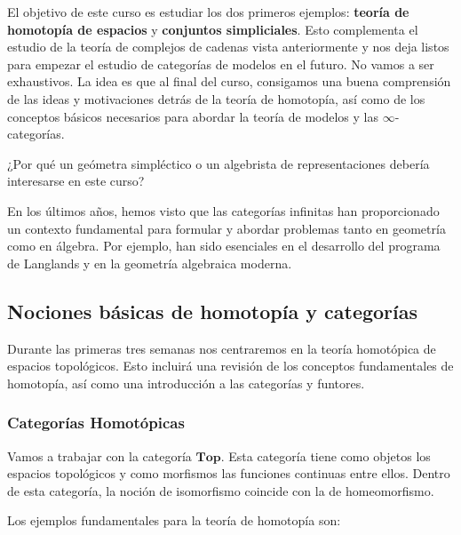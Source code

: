 El objetivo de este curso es estudiar los dos primeros ejemplos: \textbf{teoría de homotopía de espacios} y \textbf{conjuntos simpliciales}. Esto complementa el estudio de la teoría de complejos de cadenas vista anteriormente y nos deja listos para empezar el estudio de categorías de modelos en el futuro. No vamos a ser exhaustivos. La idea es que al final del curso, consigamos una buena comprensión de las ideas y motivaciones detrás de la teoría de homotopía, así como de los conceptos básicos necesarios para abordar la teoría de modelos y las $\infty$-categorías.

\begin{pregunta}
    ¿Por qué un geómetra simpléctico o un algebrista de representaciones debería interesarse en este curso?
\end{pregunta}

En los últimos años, hemos visto que las categorías infinitas han proporcionado un contexto fundamental para formular y abordar problemas tanto en geometría como en álgebra. Por ejemplo, han sido esenciales en el desarrollo del programa de Langlands y en la geometría algebraica moderna.

\subsection{Nociones básicas de homotopía y categorías}

Durante las primeras tres semanas nos centraremos en la teoría homotópica de espacios topológicos. Esto incluirá una revisión de los conceptos fundamentales de homotopía, así como una introducción a las categorías y funtores.

\subsubsection{Categorías Homotópicas}

Vamos a trabajar con la categoría $\mathbf{Top}$. Esta categoría tiene como objetos los espacios topológicos y como morfismos las funciones continuas entre ellos. Dentro de esta categoría, la noción de isomorfismo coincide con la de homeomorfismo.

Los ejemplos fundamentales para la teoría de homotopía son:

